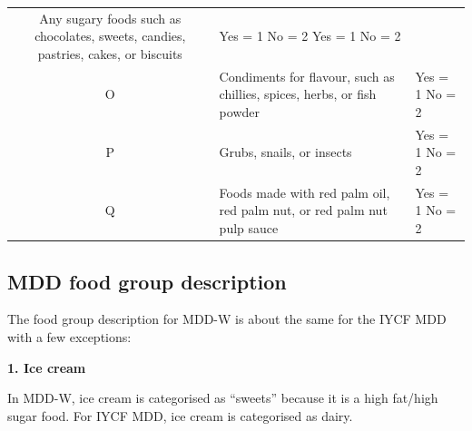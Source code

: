 \documentclass[12pt,]{book}
\theoremstyle{definition}
\theoremstyle{definition}
\theoremstyle{definition}
\theoremstyle{remark}
\begin{document}
\begin{longtable}[]{@{}cll@{}}
\begin{minipage}[t]{0.68\columnwidth}
Any sugary foods such as chocolates, sweets, candies, pastries, cakes,
or biscuits\strut
\end{minipage} & \begin{minipage}[t]{0.18\columnwidth}\raggedright
Yes = 1 No = 2 Yes = 1 No = 2\strut
\end{minipage}\tabularnewline
\begin{minipage}[t]{0.06\columnwidth}\centering
O\strut
\end{minipage} & \begin{minipage}[t]{0.68\columnwidth}\raggedright
Condiments for flavour, such as chillies, spices, herbs, or fish
powder\strut
\end{minipage} & \begin{minipage}[t]{0.18\columnwidth}\raggedright
Yes = 1 No = 2\strut
\end{minipage}\tabularnewline
\begin{minipage}[t]{0.06\columnwidth}\centering
P\strut
\end{minipage} & \begin{minipage}[t]{0.68\columnwidth}\raggedright
Grubs, snails, or insects\strut
\end{minipage} & \begin{minipage}[t]{0.18\columnwidth}\raggedright
Yes = 1 No = 2\strut
\end{minipage}\tabularnewline
\begin{minipage}[t]{0.06\columnwidth}\centering
Q\strut
\end{minipage} & \begin{minipage}[t]{0.68\columnwidth}\raggedright
Foods made with red palm oil, red palm nut, or red palm nut pulp
sauce\strut
\end{minipage} & \begin{minipage}[t]{0.18\columnwidth}\raggedright
Yes = 1 No = 2\strut
\end{minipage}\tabularnewline
\bottomrule
\end{longtable}

\hypertarget{mdd-food-group-description}{%
\subsection{MDD food group
description}\label{mdd-food-group-description}}

The food group description for MDD-W is about the same for the IYCF MDD
with a few exceptions:

\textbf{1. Ice cream}

In MDD-W, ice cream is categorised as ``sweets'' because it is a high
fat/high sugar food. For IYCF MDD, ice cream is categorised as dairy.
\end{document}
